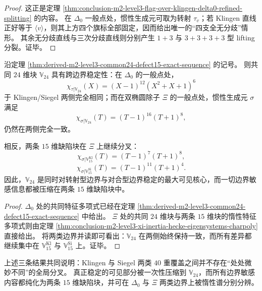 \begin{proof}
这正是定理 \ref{thm:conclusion-m2-level3-flag-over-klingen-delta0-refined-splitting}
的内容。
在 \(\Delta_0\) 一般点处，惯性生成元可取为转射 \(\tau_v\)；若 Klingen 直线正好等于 \(\langle v\rangle\)，则其上方四个旗标全部固定，因而给出唯一的“四支全无分歧”情形。
其余无分歧直线与三次分歧直线则分别产生
\(
1+3
\)
与
\(
3+3+3+3
\)
型 lifting 分裂。证毕。
\end{proof}

\begin{theorem}\label{thm:derived-m2-level3-common24-crossboundary-stability}
沿定理 \ref{thm:derived-m2-level3-common24-defect15-exact-sequence} 的记号。
则共同 \(24\) 维块 \(\mathbb V_{24}\) 具有跨边界稳定性：在 \(\Delta_0\) 的一般点处，
\[
\chi_{\tau|\mathbb V_{24}}(X)=(X-1)^{12}(X^2+X+1)^6
\]
于 Klingen/Siegel 两侧完全相同；而在双椭圆除子 \(\Xi\) 的一般点处，惯性生成元 \(\sigma\) 满足
\[
\chi_{\sigma|\mathbb V_{24}}(T)=(T-1)^{16}(T+1)^8,
\]
仍然在两侧完全一致。

相反，两条 \(15\) 维缺陷块在 \(\Xi\) 上继续分叉：
\[
\chi_{\sigma|\mathbb V_{15}^{\mathrm{Kl}}}(T)=(T-1)^7(T+1)^8,
\]
\[
\chi_{\sigma|\mathbb V_{15}^{\mathrm{Si}}}(T)=(T-1)^{11}(T+1)^4.
\]
因此，\(\mathbb V_{24}\) 是同时对转射型边界与对合型边界稳定的最大可见核心，而一切边界敏感信息都被压缩在两条 \(15\) 维缺陷块中。
\end{theorem}

\begin{proof}
\(\Delta_0\) 处的共同特征多项式已经在定理
\ref{thm:derived-m2-level3-common24-defect15-exact-sequence}
中给出。
\(\Xi\) 处的共同 \(24\) 维块与两条 \(15\) 维块的惰性特征多项式则由定理
\ref{thm:conclusion-m2-level3-xi-inertia-hecke-eigensystems-charpoly}
直接给出。
将两类边界并读即可看出：\(\mathbb V_{24}\) 在两侧始终保持一致，而所有差异都继续集中在
\(\mathbb V_{15}^{\mathrm{Kl}}\) 与 \(\mathbb V_{15}^{\mathrm{Si}}\) 上。证毕。
\end{proof}

\begin{remark}[共同核与缺陷块的读法]\label{rem:derived-m2-level3-common24-defect15-reading}
上述三条结果共同说明：Klingen 与 Siegel 两类 \(40\) 重覆盖之间并不存在“处处微妙不同”的全局分叉。
真正稳定的可见部分被一次性压缩到 \(\mathbb V_{24}\)，而所有边界敏感内容都纯化为两条 \(15\) 维缺陷块，并可在 \(\Delta_0\) 与 \(\Xi\) 两类边界上被惰性谱分别分辨。
\end{remark}

\endinput
